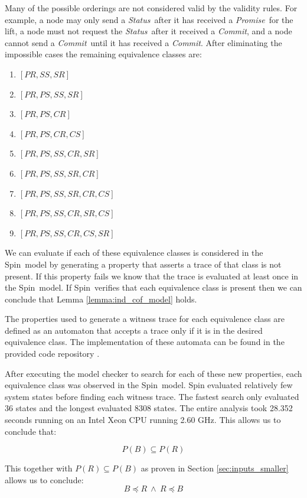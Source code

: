 \documentclass[runningheads]{llncs}
\newcommand{\promise}{\emph{Promise}}
\newcommand{\commit}{\emph{Commit}}
\newcommand{\status}{\emph{Status}}
\newcommand{\secref}[1]{Section \ref{#1}}
\newcommand{\spin}{Spin}
\newcommand{\coderepository}{provided code repository \cite{Storey_Extending_Model_Checking_2023}}
\newif\ifcomments
\newif\ifkylecomments
\newcommand{\egm}[1]{\ifcomments\textcolor{orange}{egm: #1}\fi}
\newcommand{\krs}[1]{\ifkylecomments\textcolor{blue}{krs: #1}\fi}
\begin{document}
Many of the possible orderings are not considered valid by the validity rules. For example, a node may only send a \status\ after it has received a \promise\ for the lift, a node must not request the \status\ after it received a \commit, and a node cannot send a \commit\ until it has received a \commit. 
After eliminating the impossible cases the remaining equivalence classes are:
\begin{enumerate}
    \item $[PR, SS, SR]$
    \item $[PR, PS, SS, SR]$
    \item $[PR, PS, CR]$
    \item $[PR, PS, CR, CS]$
    \item $[PR, PS, SS, CR, SR]$
    \item $[PR, PS, SS, SR, CR]$
    \item $[PR, PS, SS, SR, CR, CS]$
    \item $[PR, PS, SS, CR, SR, CS]$
    \item $[PR, PS, SS, CR, CS, SR]$
\end{enumerate}

We can evaluate if each of these equivalence classes is considered in the \spin\ model by generating a property that asserts a trace of that class is not present. If this property fails we know that the trace is evaluated at least once in the \spin\ model. If \spin\ verifies that each equivalence class is present then we can conclude that Lemma \ref{lemma:ind_cof_model} holds.

The properties used to generate a witness trace for each equivalence class are defined as an automaton that accepts a trace only if it is in the desired equivalence class. The implementation of these automata can be found in the \coderepository.
\krs{Good point. Rewritten to omit. I just can't seem to help writing Spin tutorials ;)\egm{Why talk about never claims? In the previous sub-section, we just said check the properties.}}
After executing the model checker to search for each of these new properties, each equivalence class was observed in the \spin\ model. Spin evaluated relatively few system states before finding each witness trace. The fastest search only evaluated 36 states and the longest evaluated 8308 states. The entire analysis took 28.352 seconds running on an Intel Xeon CPU running 2.60 GHz. This allows us to conclude that:


$$P(B) \subseteq P(R)$$

This together with $P(R) \subseteq P(B)$ as proven in \secref{sec:inputs_smaller} allows us to conclude:
$$B \preceq R\  \wedge\  R \preceq B$$
    
\end{document}
